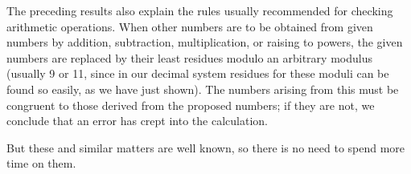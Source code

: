 The preceding results also explain the rules usually recommended for checking arithmetic operations. When other numbers are to be obtained from given numbers by addition, subtraction, multiplication, or raising to powers, the given numbers are replaced by their least residues modulo an arbitrary modulus (usually 9 or 11, since in our decimal system residues for these moduli can be found so easily, as we have just shown). The numbers arising from this must be congruent to those derived from the proposed numbers; if they are not, we conclude that an error has crept into the calculation.

But these and similar matters are well known, so there is no need to spend more time on them.

\par\bigskip\bigskip{}
